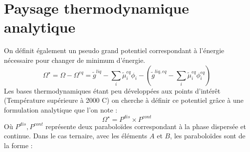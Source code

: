 \documentclass[a4paper,11pt,fleqn]{report}    %
\begin{document}
\section{Paysage thermodynamique analytique}
On définit également un pseudo grand potentiel correspondant à l'énergie nécessaire pour changer de minimum d'énergie.
\begin{equation}
\Omega^{\star} =\Omega - \Omega^{eq} =  \tilde{g}^{liq} - \sum_i \tilde{\mu}_i^{eq}\phi_i - \left(  \tilde{g}^{liq,eq} -  \sum_i \tilde{\mu}_i^{eq}\phi_i^{eq} \right) 
\end{equation}
Les bases thermodynamiques étant peu développées aux points d'intérêt (Température supérieure à 2000 \textdegree C) on cherche à définir ce potentiel grâce à une formulation analytique que l'on note :
\begin{equation}\label{double_puit}
	\Omega^{\star}  = P^{dis} \times P^{cont}
\end{equation}
Où $P^{dis}, P^{cont}$ représente deux paraboloïdes correspondant à la phase dispersée et continue. Dans le cas ternaire, avec les éléments $A$ et $B$, les paraboloïdes sont de la forme : 
\end{document}
